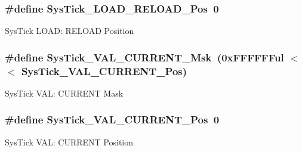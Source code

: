 \subsubsection[{\texorpdfstring{Sys\+Tick\+\_\+\+L\+O\+A\+D\+\_\+\+R\+E\+L\+O\+A\+D\+\_\+\+Pos}{SysTick_LOAD_RELOAD_Pos}}]{\setlength{\rightskip}{0pt plus 5cm}\#define Sys\+Tick\+\_\+\+L\+O\+A\+D\+\_\+\+R\+E\+L\+O\+A\+D\+\_\+\+Pos~0}\hypertarget{group__CMSIS__CM3__SysTick_gaf44d10df359dc5bf5752b0894ae3bad2}{}\label{group__CMSIS__CM3__SysTick_gaf44d10df359dc5bf5752b0894ae3bad2}
Sys\+Tick L\+O\+AD\+: R\+E\+L\+O\+AD Position 
\subsubsection[{\texorpdfstring{Sys\+Tick\+\_\+\+V\+A\+L\+\_\+\+C\+U\+R\+R\+E\+N\+T\+\_\+\+Msk}{SysTick_VAL_CURRENT_Msk}}]{\setlength{\rightskip}{0pt plus 5cm}\#define Sys\+Tick\+\_\+\+V\+A\+L\+\_\+\+C\+U\+R\+R\+E\+N\+T\+\_\+\+Msk~(0x\+F\+F\+F\+F\+F\+Ful $<$$<$ Sys\+Tick\+\_\+\+V\+A\+L\+\_\+\+C\+U\+R\+R\+E\+N\+T\+\_\+\+Pos)}\hypertarget{group__CMSIS__CM3__SysTick_gafc77b56d568930b49a2474debc75ab45}{}\label{group__CMSIS__CM3__SysTick_gafc77b56d568930b49a2474debc75ab45}
Sys\+Tick V\+AL\+: C\+U\+R\+R\+E\+NT Mask 
\subsubsection[{\texorpdfstring{Sys\+Tick\+\_\+\+V\+A\+L\+\_\+\+C\+U\+R\+R\+E\+N\+T\+\_\+\+Pos}{SysTick_VAL_CURRENT_Pos}}]{\setlength{\rightskip}{0pt plus 5cm}\#define Sys\+Tick\+\_\+\+V\+A\+L\+\_\+\+C\+U\+R\+R\+E\+N\+T\+\_\+\+Pos~0}\hypertarget{group__CMSIS__CM3__SysTick_ga3208104c3b019b5de35ae8c21d5c34dd}{}\label{group__CMSIS__CM3__SysTick_ga3208104c3b019b5de35ae8c21d5c34dd}
Sys\+Tick V\+AL\+: C\+U\+R\+R\+E\+NT Position 